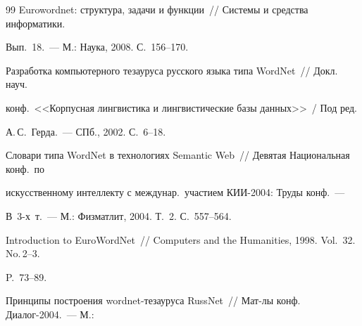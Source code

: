 {{\begin{thebibliography}{99}
Eurowordnet: структура, задачи и функции~/\!\!/ Системы и средства информатики. 


Вып.~18.~--- М.: Наука, 2008.  С.~156--170.









Разработка компьютерного тезауруса русского языка типа WordNet~/\!\!/ Докл. науч.\ 


конф.\ <<Корпусная лингвистика и лингвистические базы данных>>~/ Под ред. 


А.\,С.~Герда.~--- СПб., 2002. С.~6--18. 









Словари типа WordNet в технологиях Semantic Web~/\!\!/ Девятая Национальная конф.\ по 


искусственному интеллекту с междунар.\ участием КИИ-2004: Труды конф.~--- 


В~3-х~т.~--- М.: Физматлит, 2004. Т.~2. С.~557--564.




















Introduction to EuroWordNet~/\!\!/ Computers and the Humanities, 1998. Vol.~32. No.\,2--3. 


P.~73--89. 









Принципы построения wordnet-тезауруса RussNet~/\!\!/ Мат-лы конф. Диалог-2004.~--- М.: 



\end{thebibliography}}}
